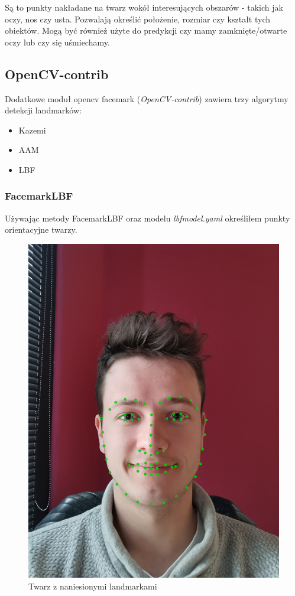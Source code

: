 \documentclass[10pt, a4paper]{article}
\begin{document}
Są to punkty nakładane na twarz wokół interesujących obszarów - takich jak oczy, nos czy usta. Pozwalają określić położenie, rozmiar czy kształt tych obiektów. Mogą być również użyte do predykcji czy mamy zamknięte/otwarte oczy lub czy się uśmiechamy. 

\subsection{OpenCV-contrib}
Dodatkowe moduł opencv facemark (\textit{OpenCV-contrib}) zawiera trzy algorytmy detekcji landmarków:

\begin{itemize}
    \item Kazemi
    \item AAM
    \item LBF
\end{itemize}

\subsubsection{FacemarkLBF}

Używając metody FacemarkLBF oraz modelu \textit{lbfmodel.yaml} określiłem punkty orientacyjne twarzy. \cite{landmarkSatyaMallick}

\begin{figure}[H]
    \begin{center}
        \includegraphics[scale=0.6]{images/landmarks_1.png}
        \caption{Twarz z naniesionymi landmarkami}
        \label{fig:landmarks_1}
    \end{center}
\end{figure}
\end{document}
